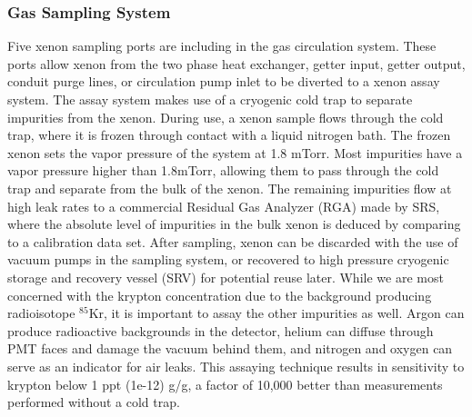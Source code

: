 \documentclass[a4paper,12pt]{article}
\begin{document}
\subsubsection{Gas Sampling System} 

Five xenon sampling ports are including in the gas circulation system.  These ports allow xenon from the two phase heat exchanger, getter input, getter output, conduit purge lines, or circulation pump inlet to be diverted to a xenon assay system.  The assay system makes use of a cryogenic cold trap to separate impurities from the xenon.  During use, a xenon sample flows through the cold trap, where it is frozen through contact with a liquid nitrogen bath.  The frozen xenon sets the vapor pressure of the system at 1.8 mTorr. Most impurities have a vapor pressure higher than 1.8mTorr, allowing them to pass through the cold trap and separate from the bulk of the xenon.  The remaining impurities flow at high leak rates to a commercial Residual Gas Analyzer (RGA) made by SRS, where the absolute level of impurities in the bulk xenon is deduced by comparing to a calibration data set.  After sampling, xenon can be discarded with the use of vacuum pumps in the sampling system, or recovered to high pressure cryogenic storage and recovery vessel (SRV) for potential reuse later.  While we are most concerned with the krypton concentration due to the background producing radioisotope $^{85}$Kr, it is important to assay the other impurities as well.  Argon can produce radioactive backgrounds in the detector, helium can diffuse through PMT faces and damage the vacuum behind them, and nitrogen and oxygen can serve as an indicator for air leaks.  This assaying technique results in sensitivity to krypton below 1 ppt (1e-12) g/g, a factor of 10,000 better than measurements performed without a cold trap.
\end{document}
